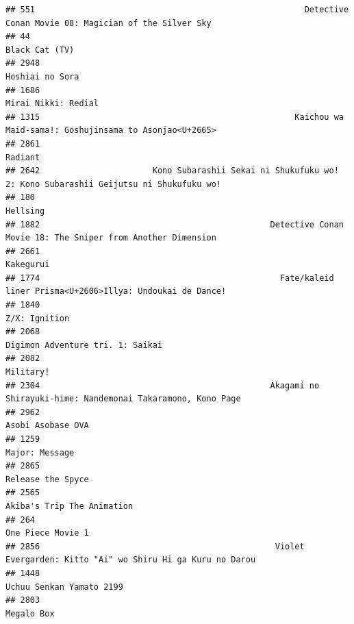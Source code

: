 \documentclass[
]{article}
\begin{document}
\begin{verbatim}
## 551                                                       Detective Conan Movie 08: Magician of the Silver Sky
## 44                                                                                              Black Cat (TV)
## 2948                                                                                           Hoshiai no Sora
## 1686                                                                                       Mirai Nikki: Redial
## 1315                                                    Kaichou wa Maid-sama!: Goshujinsama to Asonjao<U+2665>
## 2861                                                                                                   Radiant
## 2642                       Kono Subarashii Sekai ni Shukufuku wo! 2: Kono Subarashii Geijutsu ni Shukufuku wo!
## 180                                                                                                   Hellsing
## 1882                                               Detective Conan Movie 18: The Sniper from Another Dimension
## 2661                                                                                                 Kakegurui
## 1774                                                 Fate/kaleid liner Prisma<U+2606>Illya: Undoukai de Dance!
## 1840                                                                                             Z/X: Ignition
## 2068                                                                          Digimon Adventure tri. 1: Saikai
## 2082                                                                                                 Military!
## 2304                                               Akagami no Shirayuki-hime: Nandemonai Takaramono, Kono Page
## 2962                                                                                         Asobi Asobase OVA
## 1259                                                                                            Major: Message
## 2865                                                                                         Release the Spyce
## 2565                                                                                Akiba's Trip The Animation
## 264                                                                                          One Piece Movie 1
## 2856                                                Violet Evergarden: Kitto "Ai" wo Shiru Hi ga Kuru no Darou
## 1448                                                                                  Uchuu Senkan Yamato 2199
## 2803                                                                                                Megalo Box

\end{verbatim}
\end{document}
